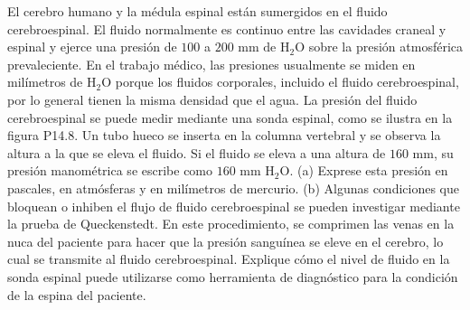 \item El cerebro humano y la médula espinal están sumergidos en el fluido cerebroespinal. El fluido normalmente es continuo entre las cavidades craneal y espinal y ejerce una presión de $100$ a $200 \text{ mm de H}_2\text{O}$ sobre la presión atmosférica prevaleciente. En el trabajo médico, las presiones usualmente se miden en milímetros de $\text{H}_2\text{O}$ porque los fluidos corporales, incluido el fluido cerebroespinal, por lo general tienen la misma densidad que el agua. La presión del fluido cerebroespinal se puede medir mediante una sonda espinal, como se ilustra en la figura P14.8. Un tubo hueco se inserta en la columna vertebral y se observa la altura a la que se eleva el fluido. Si el fluido se eleva a una altura de $160 \text{ mm}$, su presión manométrica se escribe como $160 \text{ mm H}_2\text{O}$. (a) Exprese esta presión en pascales, en atmósferas y en milímetros de mercurio. (b) Algunas condiciones que bloquean o inhiben el flujo de fluido cerebroespinal se pueden investigar mediante la prueba de Queckenstedt. En este procedimiento, se comprimen las venas en la nuca del paciente para hacer que la presión sanguínea se eleve en el cerebro, lo cual se transmite al fluido cerebroespinal. Explique cómo el nivel de fluido en la sonda espinal puede utilizarse como herramienta de diagnóstico para la condición de la espina del paciente.
